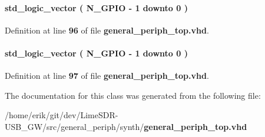 \paragraph[{inst5\+\_\+out\+\_\+val\+\_\+0}]{ {\bfseries \textcolor{comment}{std\+\_\+logic\+\_\+vector}\textcolor{vhdlchar}{ }\textcolor{vhdlchar}{(}\textcolor{vhdlchar}{ }\textcolor{vhdlchar}{ }\textcolor{vhdlchar}{ }\textcolor{vhdlchar}{ }{\bfseries {\bf N\+\_\+\+G\+P\+IO}} \textcolor{vhdlchar}{-\/}\textcolor{vhdlchar}{ } \textcolor{vhdldigit}{1} \textcolor{vhdlchar}{ }\textcolor{keywordflow}{downto}\textcolor{vhdlchar}{ }\textcolor{vhdlchar}{ } \textcolor{vhdldigit}{0} \textcolor{vhdlchar}{ }\textcolor{vhdlchar}{)}\textcolor{vhdlchar}{ }} \hspace{0.3cm}{\ttfamily [Signal]}}\label{classgeneral__periph__top_1_1arch_a96828faeb03c928f4f3390885d5c1c05}


Definition at line {\bf 96} of file {\bf general\+\_\+periph\+\_\+top.\+vhd}.

\paragraph[{inst5\+\_\+out\+\_\+val\+\_\+1}]{ {\bfseries \textcolor{comment}{std\+\_\+logic\+\_\+vector}\textcolor{vhdlchar}{ }\textcolor{vhdlchar}{(}\textcolor{vhdlchar}{ }\textcolor{vhdlchar}{ }\textcolor{vhdlchar}{ }\textcolor{vhdlchar}{ }{\bfseries {\bf N\+\_\+\+G\+P\+IO}} \textcolor{vhdlchar}{-\/}\textcolor{vhdlchar}{ } \textcolor{vhdldigit}{1} \textcolor{vhdlchar}{ }\textcolor{keywordflow}{downto}\textcolor{vhdlchar}{ }\textcolor{vhdlchar}{ } \textcolor{vhdldigit}{0} \textcolor{vhdlchar}{ }\textcolor{vhdlchar}{)}\textcolor{vhdlchar}{ }} \hspace{0.3cm}{\ttfamily [Signal]}}\label{classgeneral__periph__top_1_1arch_a3af1f87b8180cb118b1fe6cc90818006}


Definition at line {\bf 97} of file {\bf general\+\_\+periph\+\_\+top.\+vhd}.



The documentation for this class was generated from the following file\+:\begin{DoxyCompactItemize}
\item 
/home/erik/git/dev/\+Lime\+S\+D\+R-\/\+U\+S\+B\+\_\+\+G\+W/src/general\+\_\+periph/synth/{\bf general\+\_\+periph\+\_\+top.\+vhd}\end{DoxyCompactItemize}
